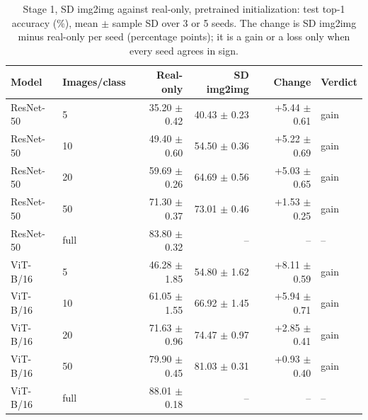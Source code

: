 \begin{table}[H]
\centering
\caption{Stage 1, SD img2img against real-only, pretrained initialization: test top-1 accuracy (\%), mean $\pm$ sample SD over 3 or 5 seeds. The change is SD img2img minus real-only per seed (percentage points); it is a gain or a loss only when every seed agrees in sign.}
\label{tab:stage1-pretrained-accuracy-sd_img2img-test}
\begin{tabular}{llrrrl}
\toprule
Model & Images/class & Real-only & SD img2img & Change & Verdict \\
\midrule
ResNet-50 & 5 & 35.20 $\pm$ 0.42 & 40.43 $\pm$ 0.23 & +5.44 $\pm$ 0.61 & gain \\
ResNet-50 & 10 & 49.40 $\pm$ 0.60 & 54.50 $\pm$ 0.36 & +5.22 $\pm$ 0.69 & gain \\
ResNet-50 & 20 & 59.69 $\pm$ 0.26 & 64.69 $\pm$ 0.56 & +5.03 $\pm$ 0.65 & gain \\
ResNet-50 & 50 & 71.30 $\pm$ 0.37 & 73.01 $\pm$ 0.46 & +1.53 $\pm$ 0.25 & gain \\
ResNet-50 & full & 83.80 $\pm$ 0.32 & -- & -- & -- \\
\midrule
ViT-B/16 & 5 & 46.28 $\pm$ 1.85 & 54.80 $\pm$ 1.62 & +8.11 $\pm$ 0.59 & gain \\
ViT-B/16 & 10 & 61.05 $\pm$ 1.55 & 66.92 $\pm$ 1.45 & +5.94 $\pm$ 0.71 & gain \\
ViT-B/16 & 20 & 71.63 $\pm$ 0.96 & 74.47 $\pm$ 0.97 & +2.85 $\pm$ 0.41 & gain \\
ViT-B/16 & 50 & 79.90 $\pm$ 0.45 & 81.03 $\pm$ 0.31 & +0.93 $\pm$ 0.40 & gain \\
ViT-B/16 & full & 88.01 $\pm$ 0.18 & -- & -- & -- \\
\bottomrule
\end{tabular}
\end{table}
